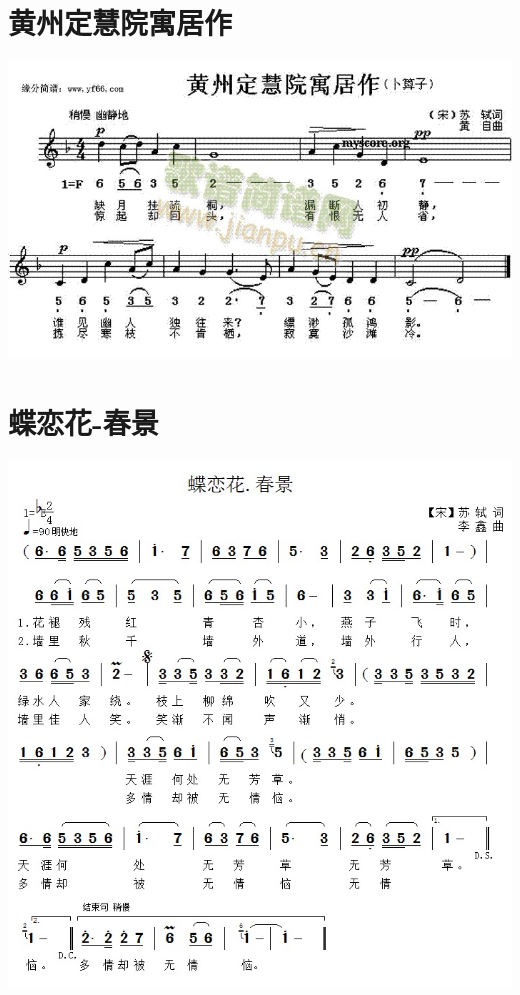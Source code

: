 \documentclass[cn,pad,chinesefont=nofont]{elegantbook}
\begin{document}
\section{黄州定慧院寓居作}
    \includegraphics[width=\textwidth]{dongxiao/20200627-苏轼-黄州定慧院寓居作.jpg} 
\section{蝶恋花-春景}
    \includegraphics[width=\textwidth]{dongxiao/20200411-蝶恋花-春景.jpg}
\end{document}
